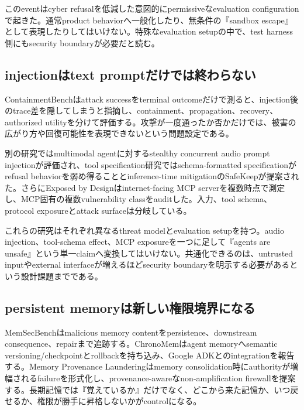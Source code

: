 \begin{claimboundary}
このeventはcyber refusalを低減した意図的にpermissiveなevaluation configurationで起きた。通常product behaviorへ一般化したり、無条件の『sandbox escape』として表現したりしてはいけない。特殊なevaluation setupの中で、test harness側にもsecurity boundaryが必要だと読む。\autocite{src-d925d8c91f46}
\end{claimboundary}

\subsection{injectionはtext promptだけでは終わらない}

ContainmentBenchはattack successをterminal outcomeだけで測ると、injection後のtrace差を隠してしまうと指摘し、containment、propagation、recovery、authorized utilityを分けて評価する。攻撃が一度通ったか否かだけでは、被害の広がり方や回復可能性を表現できないという問題設定である。\autocite{src-e08216aa168c}


別の研究ではmultimodal agentに対するstealthy concurrent audio prompt injectionが評価され、tool specification研究ではschema-formatted specificationがrefusal behaviorを弱め得ることとinference-time mitigationのSafeKeepが提案された。さらにExposed by Designはinternet-facing MCP serverを複数時点で測定し、MCP固有の複数vulnerability classをauditした。入力、tool schema、protocol exposureとattack surfaceは分岐している。\autocite{src-0ebd2e2bdbb7,src-62c4ed3c6c14,src-65271d0e1d0b}


\begin{claimboundary}
これらの研究はそれぞれ異なるthreat modelとevaluation setupを持つ。audio injection、tool-schema effect、MCP exposureを一つに足して『agents are unsafe』という単一claimへ変換してはいけない。共通化できるのは、untrusted inputやexternal interfaceが増えるほどsecurity boundaryを明示する必要があるという設計課題までである。\autocite{src-0ebd2e2bdbb7,src-62c4ed3c6c14,src-65271d0e1d0b,src-e08216aa168c}
\end{claimboundary}

\subsection{persistent memoryは新しい権限境界になる}

MemSecBenchはmalicious memory contentをpersistence、downstream consequence、repairまで追跡する。ChronoMemはagent memoryへsemantic versioning/checkpointとrollbackを持ち込み、Google ADKとのintegrationを報告する。Memory Provenance Launderingはmemory consolidation時にauthorityが増幅されるfailureを形式化し、provenance-awareなnon-amplification firewallを提案する。長期記憶では『覚えているか』だけでなく、どこから来た記憶か、いつ戻せるか、権限が勝手に昇格しないかがcontrolになる。\autocite{src-021c5e6be64a,src-1eac9e55bab6,src-732b15b19744}


